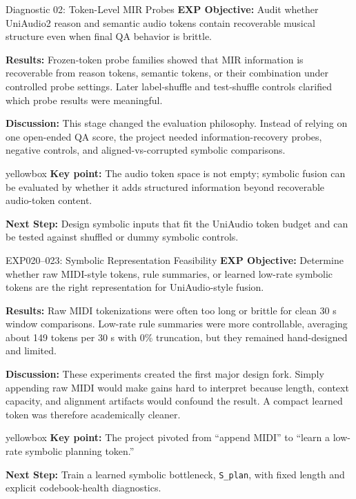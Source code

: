 \documentclass[aspectratio=169,11pt]{beamer}
\newcommand{\code}[1]{\texttt{\footnotesize #1}}
\newcommand{\expfield}[2]{\textbf{#1:} #2\par\vspace{0.10cm}}
\newenvironment{keybox}{%
  \begin{beamercolorbox}[rounded=true,sep=0.14cm,wd=\linewidth]{yellowbox}\footnotesize%
}{%
  \end{beamercolorbox}%
}
\begin{document}
\begin{frame}{Diagnostic 02: Token-Level MIR Probes}
  \footnotesize
  \expfield{EXP Objective}{Audit whether UniAudio2 reason and semantic audio tokens contain recoverable musical structure even when final QA behavior is brittle.}
  \expfield{Results}{Frozen-token probe families showed that MIR information is recoverable from reason tokens, semantic tokens, or their combination under controlled probe settings. Later label-shuffle and test-shuffle controls clarified which probe results were meaningful.}
  \expfield{Discussion}{This stage changed the evaluation philosophy. Instead of relying on one open-ended QA score, the project needed information-recovery probes, negative controls, and aligned-vs-corrupted symbolic comparisons.}
  \begin{keybox}\textbf{Key point:} The audio token space is not empty; symbolic fusion can be evaluated by whether it adds structured information beyond recoverable audio-token content.\end{keybox}
  \vspace{0.18cm}
  \expfield{Next Step}{Design symbolic inputs that fit the UniAudio token budget and can be tested against shuffled or dummy symbolic controls.}
\end{frame}

\begin{frame}{EXP020--023: Symbolic Representation Feasibility}
  \footnotesize
  \expfield{EXP Objective}{Determine whether raw MIDI-style tokens, rule summaries, or learned low-rate symbolic tokens are the right representation for UniAudio-style fusion.}
  \expfield{Results}{Raw MIDI tokenizations were often too long or brittle for clean 30 s window comparisons. Low-rate rule summaries were more controllable, averaging about 149 tokens per 30 s with 0\% truncation, but they remained hand-designed and limited.}
  \expfield{Discussion}{These experiments created the first major design fork. Simply appending raw MIDI would make gains hard to interpret because length, context capacity, and alignment artifacts would confound the result. A compact learned token was therefore academically cleaner.}
  \begin{keybox}\textbf{Key point:} The project pivoted from ``append MIDI'' to ``learn a low-rate symbolic planning token.''\end{keybox}
  \vspace{0.18cm}
  \expfield{Next Step}{Train a learned symbolic bottleneck, \code{S\_plan}, with fixed length and explicit codebook-health diagnostics.}
\end{frame}
\end{document}
